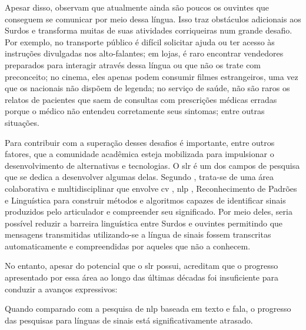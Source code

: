 Apesar disso,  observam que atualmente ainda são poucos os ouvintes que conseguem se comunicar por meio dessa língua.
Isso traz obstáculos adicionais aos Surdos e transforma muitas de suas atividades corriqueiras num grande desafio.
Por exemplo, no transporte público é difícil solicitar ajuda ou ter acesso às instruções divulgadas nos alto-falantes;
em lojas, é raro encontrar vendedores preparados para interagir através dessa língua ou que não os trate com preconceito;
no cinema, eles apenas podem consumir filmes estrangeiros, uma vez que os nacionais não dispõem de legenda;
no serviço de saúde, não são raros os relatos de pacientes que saem de consultas com prescrições médicas erradas porque o médico não entendeu corretamente seus sintomas; entre outras situações.


Para contribuir com a superação desses desafios é importante, entre outros fatores, que a comunidade acadêmica esteja mobilizada para impulsionar o desenvolvimento de alternativas e tecnologias.
O \acrfull{slr} é um dos campos de pesquisa que se dedica a desenvolver algumas delas. Segundo , trata-se de uma área colaborativa e multidisciplinar que envolve \acrlong{cv} \cite{szeliski-2022-computer-vision}, \acrlong{nlp} \cite{jurafsky-2022-speech-lang-processing}, Reconhecimento de Padrões \cite{bishop-2006-pattern-recognition} e Linguística \cite{quadros-2004-estudos-linguisticos} para construir métodos e algoritmos capazes de identificar sinais produzidos pelo articulador e compreender seu significado.
Por meio deles, seria possível reduzir a barreira linguística entre Surdos e ouvintes permitindo que mensagens transmitidas utilizando-se a língua de sinais fossem transcritas automaticamente e compreendidas por aqueles que não a conhecem.


No entanto, apesar do potencial que o \acrshort{slr} possui,  acreditam que o progresso apresentado por essa área ao longo das últimas décadas foi insuficiente para conduzir a avanços expressivos:

\begin{citacao}
    Quando comparado com a pesquisa de \acrlong{nlp} baseada em texto e fala, o progresso das pesquisas para línguas de sinais está significativamente atrasado. \cite[tradução nossa]{selvaraj-2022-openhands,yin-2021-sl-in-nlp}
\end{citacao}


